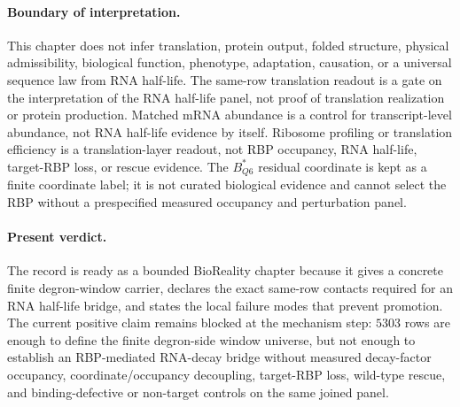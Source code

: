 \paragraph{Boundary of interpretation.}
This chapter does not infer translation, protein output, folded structure, physical admissibility, biological function, phenotype, adaptation, causation, or a universal sequence law from RNA half-life.  The same-row translation readout is a gate on the interpretation of the RNA half-life panel, not proof of translation realization or protein production.  Matched mRNA abundance is a control for transcript-level abundance, not RNA half-life evidence by itself.  Ribosome profiling or translation efficiency is a translation-layer readout, not RBP occupancy, RNA half-life, target-RBP loss, or rescue evidence.  The $B^*_{Q6}$ residual coordinate is kept as a finite coordinate label; it is not curated biological evidence and cannot select the RBP without a prespecified measured occupancy and perturbation panel.

\paragraph{Present verdict.}
The record is ready as a bounded BioReality chapter because it gives a concrete finite degron-window carrier, declares the exact same-row contacts required for an RNA half-life bridge, and states the local failure modes that prevent promotion.  The current positive claim remains blocked at the mechanism step: $5303$ rows are enough to define the finite degron-side window universe, but not enough to establish an RBP-mediated RNA-decay bridge without measured decay-factor occupancy, coordinate/occupancy decoupling, target-RBP loss, wild-type rescue, and binding-defective or non-target controls on the same joined panel.